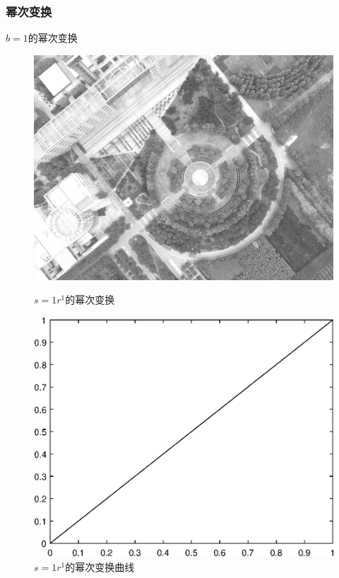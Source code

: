 \subsubsection{幂次变换}
$b=1$的幂次变换
\begin{figure}[H]
	\centering
	\begin{minipage}{0.45\linewidth}
		\includegraphics[width=\linewidth]{figure/DJI_0027_Gamma_100.png}
		\caption{$s=1r^1$的幂次变换}
	\end{minipage}
	\begin{minipage}{0.45\linewidth}
		\includegraphics[width=\linewidth]{figure/DJI_0027_Gamma_100_Graph.eps}
		\caption{$s=1r^1$的幂次变换曲线}
	\end{minipage}
\end{figure}

